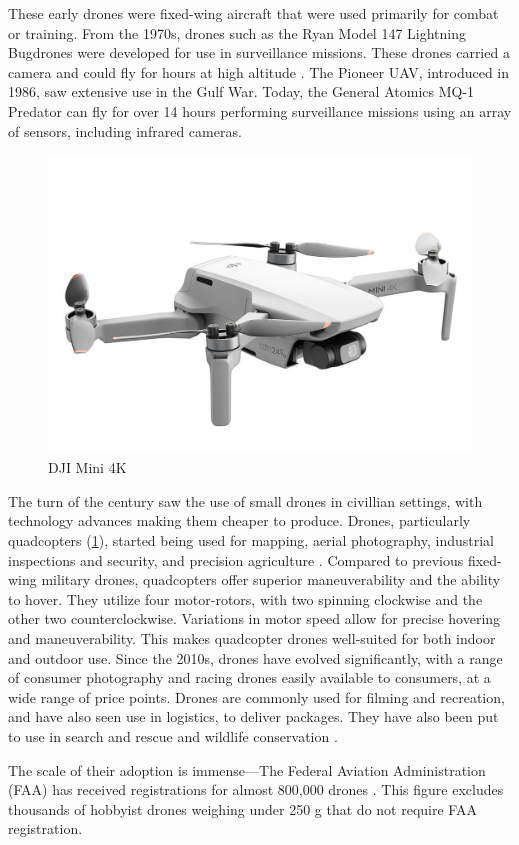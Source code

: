These early drones were fixed-wing aircraft that were used primarily for combat
or training. From the 1970s, drones such as the Ryan Model 147 Lightning
Bugdrones were developed for use in surveillance missions. These drones carried
a camera and could fly for hours at high altitude \cite{pbs12}. The Pioneer
UAV, introduced in 1986, saw extensive use in the Gulf War. Today, the General
Atomics MQ-1 Predator can fly for over 14 hours performing surveillance
missions using an array of sensors, including infrared cameras.

\begin{figure}[htbp]
\centerline{\includegraphics[width = .3\textwidth]{figs/dji-mini-4k.jpg}}
\caption{DJI Mini 4K}
\label{fig:dji-mini-4k}
\end{figure}

The turn of the century saw the use of small drones in civillian settings, with
technology advances making them cheaper to produce. Drones, particularly
quadcopters (\cref{fig:dji-mini-4k}), started being used for mapping, aerial
photography, industrial inspections and security, and precision agriculture
\cite{giones2017}. Compared to previous fixed-wing military drones, quadcopters
offer superior maneuverability and the ability to hover. They utilize four
motor-rotors, with two spinning clockwise and the other two counterclockwise.
Variations in motor speed allow for precise hovering and maneuverability. This
makes quadcopter drones well-suited for both indoor and outdoor use.  Since the
2010s, drones have evolved significantly, with a range of consumer photography
and racing drones easily available to consumers, at a wide range of price
points. Drones are commonly used for filming and recreation, and have also seen
use in logistics, to deliver packages. They have also been put to use in search and rescue
\cite{scherer2015}\cite{tomic2012}\cite{mcrae2019} and wildlife conservation \cite{gemert2015}\cite{gonzalez2016}.

The scale of their adoption is
immense---The Federal Aviation Administration (FAA) has received registrations
for almost 800,000 drones \cite{faa_drones_2024}.  This figure excludes
thousands of hobbyist drones weighing under 250 g that do not require FAA
registration.

